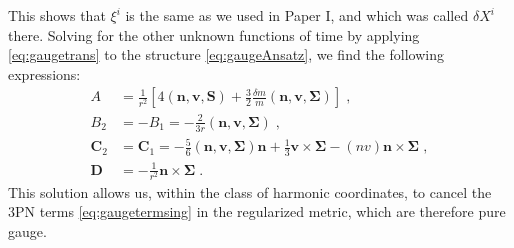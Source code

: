 \documentclass[
superscriptaddress,
preprint,
prd,tightenlines,showpacs,nofootinbib,
eqsecnum,
amsfonts,amsmath,amssymb]{revtex4-1}
\begin{document}
This shows that $\xi^{i}$ is the same as we used in Paper I, and which
was called $\delta X^{i}$ there. Solving for the other unknown
functions of time by applying \eqref{eq:gaugetrans} to the structure
\eqref{eq:gaugeAnsatz}, we find the following expressions:
\begin{subequations}
  \begin{align} \label{eq:gaugeres}
    A &= \frac{1}{r^{2}} \left[ 4 (\mathbf{n},\mathbf{v},\mathbf{S}) + \frac{3}{2} \frac{\delta m}{m} (\mathbf{n},\mathbf{v},\mathbf{\Sigma}) \right] \; , \\
    B_{2} &= - B_{1} = -\frac{2}{3 r} (\mathbf{n},\mathbf{v},\mathbf{\Sigma}) \; , \\
    \mathbf{C}_{2} &= \mathbf{C}_{1} = -\frac{5}{6} (\mathbf{n},\mathbf{v},\mathbf{\Sigma}) \mathbf{n} + \frac{1}{3} \mathbf{v}\times\mathbf{\Sigma} - (nv) \mathbf{n}\times\mathbf{\Sigma} \; , \\
    \mathbf{D} &= -\frac{1}{r^{2}} \mathbf{n}\times\mathbf{\Sigma} \;
    .
\end{align}
\end{subequations}
This solution allows us, within the class of harmonic coordinates, to
cancel the 3PN terms \eqref{eq:gaugetermsing} in the regularized
metric, which are therefore pure gauge.


\end{document}
